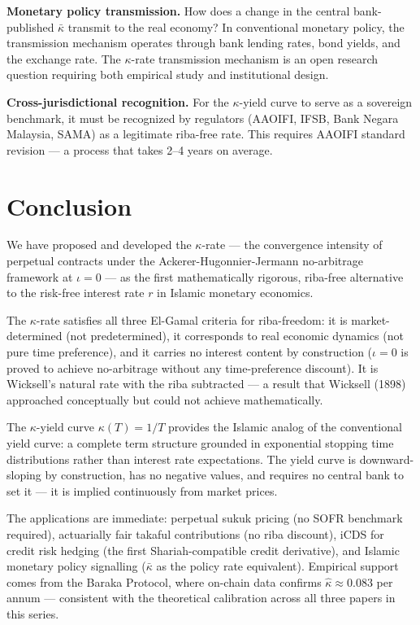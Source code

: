 \documentclass[10pt,twocolumn]{article}
\theoremstyle{plain}
\theoremstyle{definition}
\begin{document}
\textbf{Monetary policy transmission.}
How does a change in the central bank-published $\bar\kappa$
transmit to the real economy? In conventional monetary policy,
the transmission mechanism operates through bank lending rates,
bond yields, and the exchange rate. The $\kappa$-rate
transmission mechanism is an open research question requiring
both empirical study and institutional design.

\textbf{Cross-jurisdictional recognition.}
For the $\kappa$-yield curve to serve as a sovereign benchmark,
it must be recognized by regulators (AAOIFI, IFSB, Bank Negara
Malaysia, SAMA) as a legitimate riba-free rate. This requires
AAOIFI standard revision --- a process that takes 2--4 years
on average.

\section{Conclusion}
\label{sec:conclusion}

We have proposed and developed the $\kappa$-rate --- the
convergence intensity of perpetual contracts under the
Ackerer-Hugonnier-Jermann no-arbitrage framework at $\iota = 0$
--- as the first mathematically rigorous, riba-free alternative
to the risk-free interest rate $r$ in Islamic monetary economics.

The $\kappa$-rate satisfies all three El-Gamal criteria for
riba-freedom: it is market-determined (not predetermined), it
corresponds to real economic dynamics (not pure time preference),
and it carries no interest content by construction ($\iota = 0$
is proved to achieve no-arbitrage without any time-preference
discount). It is Wicksell's natural rate with the riba subtracted
--- a result that Wicksell (1898) approached conceptually but
could not achieve mathematically.

The $\kappa$-yield curve $\kappa(T) = 1/T$ provides the Islamic
analog of the conventional yield curve: a complete term structure
grounded in exponential stopping time distributions rather than
interest rate expectations. The yield curve is downward-sloping
by construction, has no negative values, and requires no central
bank to set it --- it is implied continuously from market prices.

The applications are immediate: perpetual sukuk pricing (no SOFR
benchmark required), actuarially fair takaful contributions (no
riba discount), iCDS for credit risk hedging (the first
Shariah-compatible credit derivative), and Islamic monetary
policy signalling ($\bar\kappa$ as the policy rate equivalent).
Empirical support comes from the Baraka Protocol, where on-chain
data confirms $\hat\kappa \approx 0.083$ per annum --- consistent
with the theoretical calibration across all three papers in this
series.
\end{document}
